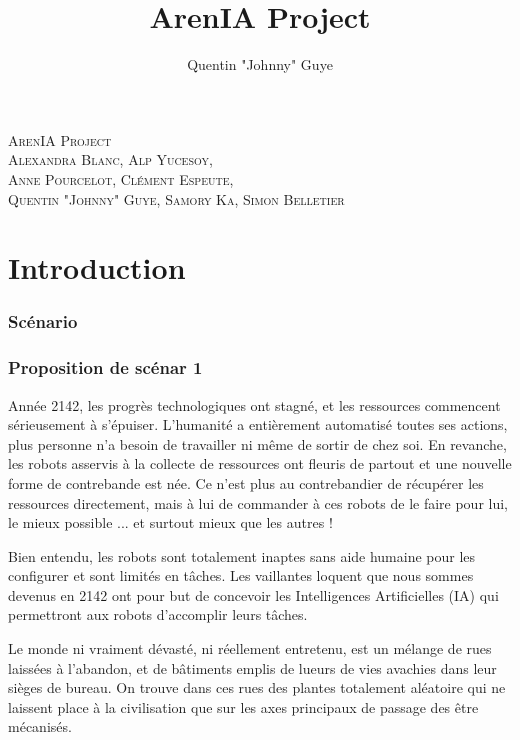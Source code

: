 \documentclass[10pt]{article}
\begin{document}
\title{\textbf{ArenIA Project}}
\author{Quentin "Johnny" Guye}
\date{}
\setlength{\headheight}{40pt}
\renewcommand{\arraystretch}{2}



\parbox[c][200pt][c]{\textwidth}{
	\begin{center}
	\textsc{\Large ArenIA Project \newline
	\\ \scriptsize Alexandra Blanc, Alp Yucesoy,\\ Anne Pourcelot, Clément Espeute, \\Quentin "Johnny" Guye, Samory Ka, Simon Belletier\\}
	\end{center}
}

\newpage

\renewcommand{\contentsname}{Sommaire}
\tableofcontents
\newpage
\part{Introduction}

\section{Scénario}
\section*{Proposition de scénar 1}

Année 2142, les progrès technologiques ont stagné, et les ressources commencent sérieusement à s'épuiser. L'humanité a entièrement automatisé toutes ses actions, plus personne n'a besoin de travailler ni même de sortir de chez soi. En revanche, les robots asservis à la collecte de ressources ont fleuris de partout et une nouvelle forme de contrebande est née. Ce n'est plus au contrebandier de récupérer les ressources directement, mais à lui de commander à ces robots de le faire pour lui, le mieux possible ... et surtout mieux que les autres !

Bien entendu, les robots sont totalement inaptes sans aide humaine pour les configurer et sont limités en tâches. Les vaillantes loquent que nous sommes devenus en 2142 ont pour but de concevoir les Intelligences Artificielles (IA) qui permettront aux robots d'accomplir leurs tâches.

Le monde ni vraiment dévasté, ni réellement entretenu, est un mélange de rues laissées à l'abandon, et de bâtiments emplis de lueurs de vies avachies dans leur sièges de bureau. On trouve dans ces rues des plantes totalement aléatoire qui ne laissent place à la civilisation que sur les axes principaux de passage des être mécanisés.
\end{document}
